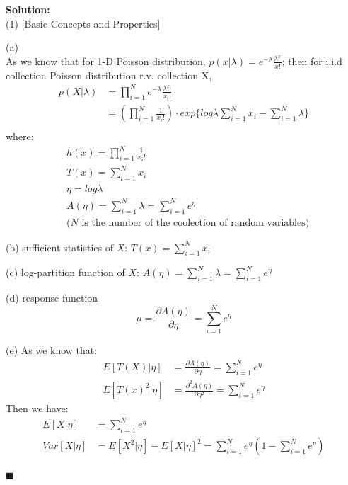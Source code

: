 \documentclass{article}
\newenvironment{solution}                               %
{\textbf{Solution:} \\}{$\blacksquare$\newline}         %
\begin{document}
    \begin{solution}
        (1) [Basic Concepts and Properties]

        (a) \\
        As we know that for 1-D Poisson distribution, $p(x | \lambda) = e^{-\lambda} \frac{\lambda^x}{x!}$; then for i.i.d collection Poisson distribution r.v. collection X,
        \begin{align*}
            p(X | \lambda) &= \prod\limits_{i=1}^{N} e^{-\lambda} \frac{\lambda^{x_i}}{x_i!} \\
            &= (\prod\limits_{i=1}^{N}{\frac{1}{x_i!}}) \cdot
               exp\{ log{\lambda}\sum\limits_{i=1}^{N}{x_i} - \sum\limits_{i=1}^{N}{\lambda} \} \\
        \end{align*}
        where:
        \begin{align*}
            & h(x) = \prod\limits_{i=1}^{N}{\frac{1}{x_i!}} \\
            & T(x) = \sum\limits_{i=1}^{N}{x_i}\\
            & \eta = log{\lambda}\\
            & A(\eta) = \sum\limits_{i=1}^{N}{\lambda} = \sum\limits_{i=1}^{N}{e^{\eta}} \\
            & \text{($N$ is the number of the coolection of random variables)}
        \end{align*}

        (b) sufficient statistics of $X$: $T(x) = \sum\limits_{i=1}^{N}{x_i}$

        (c) log-partition function of $X$: $A(\eta) = \sum\limits_{i=1}^{N}{\lambda} = \sum\limits_{i=1}^{N}{e^{\eta}}$

        (d) response function
        $$
            \mu = \frac{\partial A(\eta)}{\partial \eta}
            = \sum\limits_{i=1}^{N}{e^{\eta}}
        $$

        (e)
        As we know that:
        \begin{align*}
            E[T(X)|\eta] &= \frac{\partial A(\eta)}{\partial \eta}
            = \sum\limits_{i=1}^{N}{e^{\eta}}
            \\
            E[T(x)^2|\eta] &= \frac{\partial^2 A(\eta)}{\partial \eta^2}
            = \sum\limits_{i=1}^{N}{e^{\eta}}
        \end{align*}
        Then we have:
        \begin{align*}
            E[X|\eta] &= \sum\limits_{i=1}^{N}{e^{\eta}}
            \\
            Var[X|\eta] &= E[X^2|\eta] - E[X|\eta]^2
            = \sum\limits_{i=1}^{N}{e^{\eta}} (1 - \sum\limits_{i=1}^{N}{e^{\eta}})
        \end{align*}


\end{solution}
\end{document}
